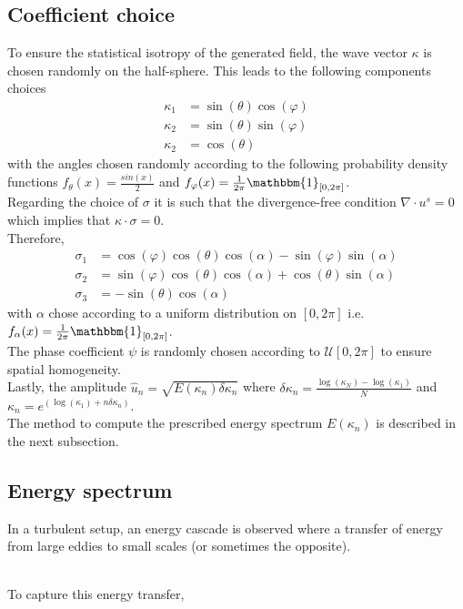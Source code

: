 \documentclass[a4paper,12pt]{article}
\begin{document}
\subsection{Coefficient choice}
To ensure the statistical isotropy of the generated field, the wave vector $\kappa$ is chosen randomly on the half-sphere.
This leads to the following components choices
\begin{align}
    \kappa_1 &= \sin(\theta)\cos(\varphi) \\
    \kappa_2 &= \sin(\theta)\sin(\varphi) \\
    \kappa_2 & = \cos(\theta)
\end{align}
with the angles chosen randomly according to the following probability density functions $f_\theta(x)=\frac{sin(x)}{2}$ and $f_\varphi(x)=\frac{1}{2\pi}\mathbbm{1}_{[0,2\pi]}$. \\
Regarding the choice of $\sigma$ it is such that the divergence-free condition $\nabla\cdot u^s=0$ which implies that $\kappa\cdot\sigma=0$. \\
Therefore, 
\begin{align}
    \sigma_1&=\cos(\varphi)\cos(\theta)\cos(\alpha)-\sin(\varphi)\sin(\alpha) \\
    \sigma_2&=\sin(\varphi)\cos(\theta)\cos(\alpha)+\cos(\theta)\sin(\alpha) \\
    \sigma_3&=-\sin(\theta)\cos(\alpha)
\end{align}
with $\alpha$ chose according to a uniform distribution on $[0,2\pi]$ i.e. $f_\alpha(x)=\frac{1}{2\pi}\mathbbm{1}_{[0,2\pi]}$. \\
The phase coefficient $\psi$ is randomly chosen according to $\mathcal{U}[0,2\pi]$ to ensure spatial homogeneity. \\
Lastly, the amplitude $\hat{u}_n=\sqrt{E(\kappa_n)\delta \kappa_n}$ where $\delta \kappa_n = \frac{\log(\kappa_N)-\log(\kappa_1)}{N}$ and $\kappa_n=e^{(\log(\kappa_1)+n\delta \kappa_n)}$. \\
The method to compute the prescribed energy spectrum $E(\kappa_n)$ is described in the next subsection.

\subsection{Energy spectrum}
In a turbulent setup, an energy cascade is observed where a transfer of energy from large eddies to small scales (or sometimes the opposite). 

\\To capture this energy transfer, 
\end{document}
